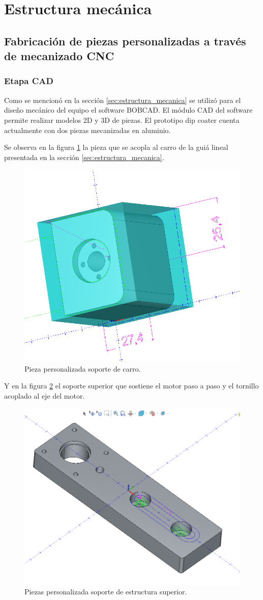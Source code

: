 
\section{Estructura mecánica}
\subsection{Fabricación de piezas personalizadas a través de mecanizado CNC}

\subsubsection{Etapa CAD}

Como se mencionó en la sección \ref{sec:estructura_mecanica} se utilizó para el diseño mecánico del equipo el software BOBCAD. El módulo CAD del software permite realizar modelos 2D y 3D de piezas.
El prototipo dip coater cuenta actualmente con dos piezas mecanizadas en aluminio.
 
Se observa en la figura \ref{fig:carro} la pieza que se acopla al carro de la guiá lineal presentada en la sección \ref{sec:estructura_mecanica}.

\begin{figure}[ht]
	\centering
	\includegraphics[width=.5\textwidth]{./Figures/3d_carro.png}
	\caption{Pieza personalizada soporte de carro.}
	\label{fig:carro}
\end{figure}

Y en la figura \ref{fig:estructura_superior} el soporte superior que sostiene el motor paso a paso y el  tornillo acoplado al eje del motor.

\begin{figure}[h]
	\centering
	\includegraphics[width=.5\textwidth]{./Figures/3d_top.png}
	\caption{Piezas personalizada soporte de estructura superior.}
	\label{fig:estructura_superior}
\end{figure}

